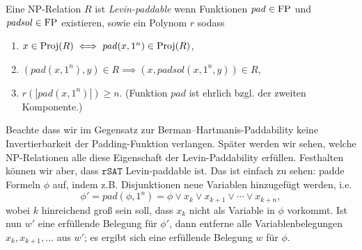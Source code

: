 \begin{definition}\label{def:levin-paddable}
    Eine NP-Relation $R$ ist \emph{Levin-paddable} wenn 
    Funktionen $\mathit{pad}\in\mathrm{FP}$ und $\mathit{padsol}\in\mathrm{FP}$ existieren, sowie ein Polynom $r$ sodass
    \begin{enumerate}
        \item $x\in \operatorname{Proj}(R) \iff \mathit{pad}(x, 1^n) \in \operatorname{Proj}(R)$,
        \item $(\mathit{pad}(x, 1^n), y)\in R \implies (x, \mathit{padsol}(x, 1^n, y)) \in R$,
        \item $r(|\mathit{pad}(x, 1^n)|)\geq n$. (Funktion $\mathit{pad}$ ist ehrlich bzgl. der zweiten Komponente.)\qedhere
    \end{enumerate}
\end{definition}
Beachte dass wir im Gegensatz zur Berman--Hartmanis-Paddability keine Invertierbarkeit der Padding-Funktion verlangen.
Später werden wir sehen, welche NP-Relationen alle diese Eigenschaft der Levin-Paddability erfüllen. Festhalten können wir aber, dass $\mathtt{rSAT}$ Levin-paddable ist. Das ist einfach zu sehen: padde Formeln $\phi$ auf, indem z.B. Disjunktionen neue Variablen hinzugefügt werden, i.e. 
\[ \phi' = \mathit{pad}(\phi, 1^n) = \phi \lor x_k \lor x_{k+1} \lor \cdots \lor x_{k+n}, \]
wobei $k$ hinreichend groß sein soll, dass $x_k$ nicht als Variable in $\phi$ vorkommt.
Ist nun $w'$ eine erfüllende Belegung für $\phi'$, dann entferne alle Variablenbelegungen $x_{k}, x_{k+1}, \dots$ aus $w'$; es ergibt sich eine erfüllende Belegung $w$ für $\phi$.

